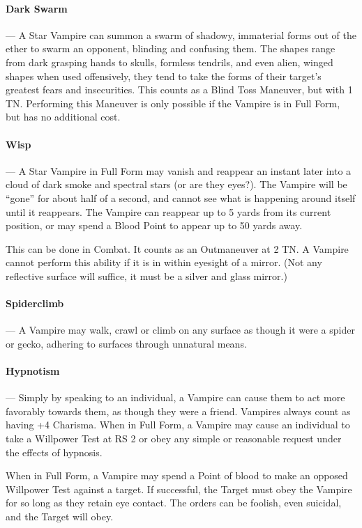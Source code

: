 \documentclass[oneside,11pt,english]{book}
\begin{document}
\paragraph{Dark Swarm}---\quad
A Star Vampire can summon a swarm of shadowy, immaterial forms out of the ether to swarm 
an opponent, blinding and confusing them. The shapes range from dark grasping hands to 
skulls, formless tendrils, and even alien, winged shapes when used offensively, they tend to 
take the forms of their target’s greatest fears and insecurities. This counts as a Blind Toss 
Maneuver, but with 1 TN. Performing this Maneuver  is only possible if the Vampire is in Full 
Form, but has no additional cost. 

\paragraph{Wisp}---\quad
A Star Vampire in Full Form may vanish and reappear an instant later into a cloud of dark 
smoke and spectral stars (or are they eyes?). The Vampire will be “gone” for about half of a 
second, and cannot see what is happening around itself until it reappears. The Vampire can 
reappear up to 5 yards from its current position, or may spend a Blood Point to appear up to 50 
yards away.

This can be done in Combat. It counts as an Outmaneuver at 2 TN.
A Vampire cannot perform this ability if it is in within eyesight of a mirror. (Not any reflective 
surface will suffice, it must be a silver and glass mirror.)

\paragraph{Spiderclimb}---\quad
A Vampire may walk, crawl or climb on any surface as though it were a spider or gecko, 
adhering to surfaces through unnatural means. 

\paragraph{Hypnotism}---\quad
Simply by speaking to an individual, a Vampire can cause them to act more favorably towards 
them, as though they were a friend. Vampires always count as having +4 Charisma. 
When in Full Form, a Vampire may cause an individual to take a Willpower Test at RS 2 or obey 
any simple or reasonable request under the effects of hypnosis. 

When in Full Form, a Vampire may spend a Point of blood to make an opposed Willpower Test 
against a target. If successful, the Target must obey the Vampire for so long as they retain eye 
contact. The orders can be foolish, even suicidal, and the Target will obey. 
\end{document}
